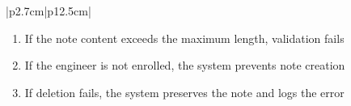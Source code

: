 \begin{table}[H]
\begin{tabular}{|p{2.7cm}|p{12.5cm}|}
\begin{minipage}[t]{\linewidth}
                                          \begin{enumerate}[topsep=0pt,itemsep=1pt,parsep=0pt,partopsep=0pt]
                                              \item If the note content exceeds the maximum length, validation fails
                                              \item If the engineer is not enrolled, the system prevents note creation
                                              \item If deletion fails, the system preserves the note and logs the error
                                          \end{enumerate}
                                      \end{minipage}     \\
            \hline
        \end{tabular}
        \label{tab:eng-notes}
    \end{table}
